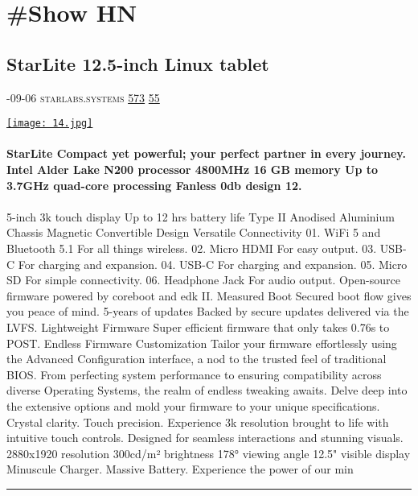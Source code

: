 \documentclass[10pt,a4paper]{article}
\begin{document}
\newpage
\section{\#Show HN}

\begin{multicols}{2}

\noindent\begin{minipage}{\linewidth}
\subsection{StarLite 12.5-inch Linux tablet}
\textsc{\footnotesize
{\scriptsize\faCalendar}-09-06 
{\scriptsize\faGlobe}\space 
starlabs.systems 
{\scriptsize\faThumbsOUp}\space 
\href{http://news.ycombinator.com/item?id=37169696\&utm\_term=comment}{573} 
{\scriptsize\faComments}\space 
\href{http://news.ycombinator.com/item?id=37169696\&utm\_term=comment}{55} 
}
\par\medskip\noindent
\href{https://us.starlabs.systems/pages/starlite?utm\_source=hackernewsletter\&utm\_medium=email\&utm\_term=show\_hn}{
    \texttt{[image: 14.jpg]}
}
\end{minipage}
\paragraph{}
\textbf{StarLite
Compact yet powerful; your perfect partner in every journey.
Intel Alder Lake
N200
processor
4800MHz
16 GB
memory
Up to
3.7GHz
quad-core processing
Fanless
0db
design
12.}
\paragraph{}
5-inch
3k
touch display
Up to
12 hrs
battery life
Type II Anodised
Aluminium
Chassis
Magnetic
Convertible
Design
Versatile Connectivity
01.
WiFi 5 and Bluetooth 5.1
For all things wireless.
02.
Micro HDMI
For easy output.
03.
USB-C
For charging and expansion.
04.
USB-C
For charging and expansion.
05.
Micro SD
For simple connectivity.
06.
Headphone Jack
For audio output.
Open-source firmware
powered by
coreboot
and
edk II.
Measured Boot
Secured boot flow gives you peace of mind.
5-years of updates
Backed by secure updates delivered via the LVFS.
Lightweight Firmware
Super efficient firmware that only takes 0.76s to POST.
Endless Firmware Customization
Tailor your firmware effortlessly using the Advanced Configuration interface, a nod to the trusted feel of
traditional BIOS.
From perfecting system performance to ensuring compatibility across diverse Operating Systems, the realm of endless tweaking awaits. Delve deep into the extensive options and mold your firmware to your unique specifications.
Crystal clarity. Touch precision.
Experience 3k resolution brought to life with intuitive touch controls. Designed for seamless interactions and stunning visuals.
2880x1920
resolution
300cd/m²
brightness
178°
viewing angle
12.5"
visible display
Minuscule Charger.
Massive Battery.
Experience the power of our min
\par\noindent\textcolor{red}{\rule{\linewidth}{0.2mm}}
\vfill
\null
\noindent\begin{minipage}{\linewidth}

\end{minipage}
\end{multicols}
\end{document}
